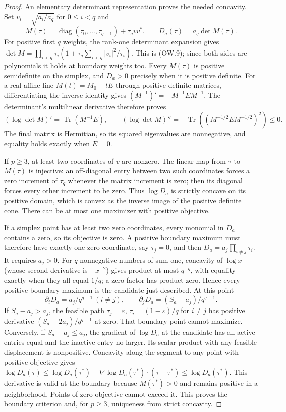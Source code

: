 \documentclass[11pt]{article}
\newcommand{\diag}{\operatorname{diag}}
\newcommand{\Tr}{\operatorname{Tr}}
\begin{document}
\begin{proof}
An elementary determinant representation proves the needed concavity.
Set $v_i=\sqrt{a_i/a_q}$ for $0\le i<q$ and
\[
 M(\tau)=\diag(\tau_0,\ldots,\tau_{q-1})+\tau_q vv^*.
 \qquad D_a(\tau)=a_q\det M(\tau).                       \tag{OW.9}
\]
For positive first $q$ weights, the rank-one determinant expansion
gives $\det M=\prod_{i<q}\tau_i(1+\tau_q\sum_{i<q}|v_i|^2/\tau_i)$.
This is (OW.9); since both sides are polynomials it holds at boundary
weights too. Every $M(\tau)$ is positive semidefinite on the simplex,
and $D_a>0$ precisely when it is positive definite.
For a real affine line $M(t)=M_0+tE$ through positive definite
matrices, differentiating the inverse identity gives
$(M^{-1})'=-M^{-1}EM^{-1}$. The determinant's multilinear derivative
therefore proves
\[
 (\log\det M)'=\Tr(M^{-1}E),\qquad
 (\log\det M)''=-\Tr((M^{-1/2}EM^{-1/2})^2)\le0.
 \tag{OW.10}
\]
The final matrix is Hermitian, so its squared eigenvalues are
nonnegative, and equality holds exactly when $E=0$.

If $p\ge3$, at least two coordinates of $v$ are nonzero. The
linear map from $\tau$ to $M(\tau)$ is injective: an off-diagonal
entry between two such coordinates forces a zero increment of
$\tau_q$ whenever the matrix increment is zero; then its diagonal
forces every other increment to be zero. Thus $\log D_a$ is
strictly concave on its positive domain, which is convex as the
inverse image of the positive definite cone. There can be at most
one maximizer with positive objective.

If a simplex point has at least two zero coordinates, every monomial
in $D_a$ contains a zero, so its objective is zero. A positive
boundary maximum must therefore have exactly one zero coordinate,
say $\tau_j=0$, and then
$D_a=a_j\prod_{i\ne j}\tau_i$. It requires $a_j>0$.
For $q$ nonnegative numbers of sum one, concavity of $\log x$
(whose second derivative is $-x^{-2}$) gives product at most $q^{-q}$,
with equality exactly when they all equal $1/q$; a zero factor
has product zero. Hence every positive boundary maximum is the
candidate just described. At this point
\[
 \partial_iD_a=a_j/q^{q-1}\ (i\ne j),\qquad
 \partial_jD_a=(S_a-a_j)/q^{q-1}.                          \tag{OW.11}
\]
If $S_a-a_j>a_j$, the feasible path
$\tau_j=\varepsilon$, $\tau_i=(1-\varepsilon)/q$ for $i\ne j$
has positive derivative $(S_a-2a_j)/q^{q-1}$ at zero. That
boundary point cannot maximize. Conversely, if $S_a-a_j\le a_j$,
the gradient of $\log D_a$ at the candidate has all active entries
equal and the inactive entry no larger. Its scalar product with
any feasible displacement is nonpositive. Concavity along the
segment to any point with positive objective gives
$\log D_a(\tau)\le\log D_a(\tau^*)+
\nabla\log D_a(\tau^*)\cdot(\tau-\tau^*)\le\log D_a(\tau^*)$.
This derivative is valid at the boundary because $M(\tau^*)>0$
and remains positive in a neighborhood. Points of zero objective
cannot exceed it. This proves the boundary criterion and, for
$p\ge3$, uniqueness from strict concavity.


\end{proof}
\end{document}
